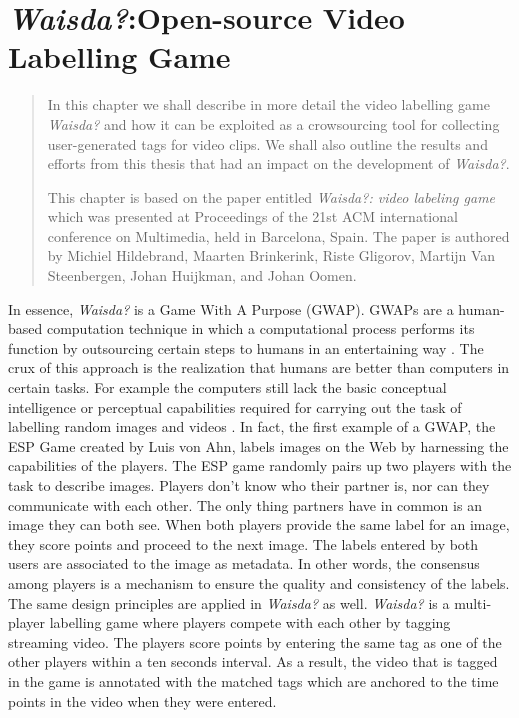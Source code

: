 \chapter{\textit{Waisda?}:Open-source Video Labelling Game}

\begin{quotation}
\noindent 
In this chapter we shall describe in more detail the video labelling game \textit{Waisda?} and how it can be exploited as a crowsourcing tool for collecting user-generated tags for video clips. We shall also outline the results and efforts from this thesis that had an impact on the development of \textit{Waisda?}.

This chapter is based on the paper entitled \textit{Waisda?: video labeling game} which was presented at Proceedings of the 21st ACM international conference on Multimedia, held in Barcelona, Spain. The paper is authored by Michiel Hildebrand, Maarten Brinkerink, Riste Gligorov, Martijn Van Steenbergen, Johan Huijkman, and Johan Oomen.
\end{quotation}

In essence, \textit{Waisda?} is a Game With A Purpose (GWAP). GWAPs are a human-based computation technique in which a computational process performs its function by outsourcing certain steps to humans in an entertaining way \cite{Ahn:2006:GP:1155311.1155342,gwap}. The crux of this approach is the realization that humans are better than computers in certain tasks. For example the computers still lack the basic conceptual intelligence or perceptual capabilities required for carrying out the task of labelling random images and videos \cite{Ahn:2006:GP:1155311.1155342}. In fact, the first example of a GWAP, the ESP Game created by Luis von Ahn, labels images on the Web by harnessing the capabilities of the players. The ESP game randomly pairs up two players with the task to describe images. Players don't know who their partner is, nor can
they communicate with each other. The only thing partners have in common is an image they can both see.
When both players provide the same label for an image, they score points and proceed to the next image. The labels entered by both users are associated to the image as metadata. In other words, the consensus among players is a mechanism to ensure the quality and consistency of the labels. The same design principles are applied in \textit{Waisda?} as well. \textit{Waisda?} is a multi-player labelling game where players compete with each other by tagging streaming video. The players score points by entering the same tag as one of the other players within a ten seconds interval. As a result, the video that is tagged in the game is annotated with the matched tags which are anchored to the time points in the video when they were entered.

